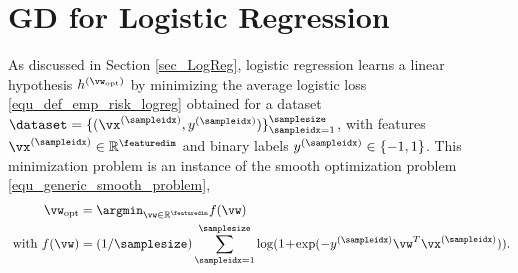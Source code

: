 \documentclass[12pt]{report}
\begin{document}
\section{GD for Logistic Regression}
\label{sec_GD_logistic_regression}

As discussed in Section \ref{sec_LogReg}, logistic regression learns 
a linear hypothesis $h^{(\vw_{\rm opt})}$ by minimizing the average logistic loss 
\eqref{equ_def_emp_risk_logreg} obtained for a dataset $\dataset= \{ (\vx^{(\sampleidx)}, y^{(\sampleidx)}) \}_{\sampleidx=1}^{\samplesize}$, with features $\vx^{(\sampleidx)} \in \mathbb{R}^{\featuredim}$ 
and binary labels $y^{(\sampleidx)} \in \{-1,1\}$. This minimization problem is an instance 
of the smooth optimization problem \eqref{equ_generic_smooth_problem},
\begin{align} 
\label{equ_smooth_problem_logeg}
\vw_{\rm opt} & = \argmin_{\vw \in \mathbb{R}^{\featuredim}} f(\vw) \nonumber \\ 
 \mbox{ with } f(\vw) & = (1/\samplesize) \sum_{\sampleidx=1}^{\samplesize} \log( 1\!+\!\exp ( - y^{(\sampleidx)} \vw^{T} \vx^{(\sampleidx)})). 
\end{align} 
\end{document}
